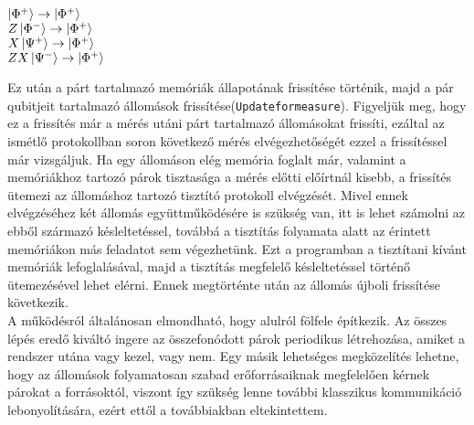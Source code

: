 \begin{center}
$\ket{\Phi^+} \rightarrow \ket{\Phi^+}$ \\
$Z\ket{\Phi^-} \rightarrow \ket{\Phi^+}$ \\
$X\ket{\Psi^+} \rightarrow \ket{\Phi^+}$ \\
$ZX\ket{\Psi^-} \rightarrow \ket{\Phi^+}$ \\
\end{center}
Ez után a párt tartalmazó memóriák állapotának frissítése történik, majd a pár qubitjeit tartalmazó állomások frissítése(\texttt{Updateformeasure}). Figyeljük meg, hogy ez a frissítés már a mérés utáni párt tartalmazó állomásokat frissíti, ezáltal az ismétlő protokollban soron következő mérés elvégezhetőségét ezzel a frissítéssel már vizsgáljuk.
Ha egy állomáson elég memória foglalt már, valamint a memóriákhoz tartozó párok tisztasága a mérés előtti előírtnál kisebb, a frissítés ütemezi az állomáshoz tartozó tisztító protokoll elvégzését. Mivel ennek elvégzéséhez két állomás együttműködésére is szükség van, itt is lehet számolni az ebből származó késleltetéssel, továbbá a tisztítás folyamata alatt az érintett memóriákon más feladatot sem végezhetünk. Ezt a programban a tisztítani kívánt memóriák lefoglalásával, majd a tisztítás megfelelő késleltetéssel történő ütemezésével lehet elérni. Ennek megtörténte után az állomás újboli frissítése következik. \\
A működésról általánosan elmondható, hogy alulról fölfele építkezik. Az összes lépés eredő kiváltó ingere az összefonódott párok periodikus létrehozása, amiket a rendszer utána vagy kezel, vagy nem. Egy másik lehetséges megközelítés lehetne, hogy az állomások folyamatosan szabad erőforrásaiknak megfelelően kérnek párokat a forrásoktól, viszont így szükség lenne további klasszikus kommunikáció lebonyolítására, ezért ettől a továbbiakban eltekintettem.

